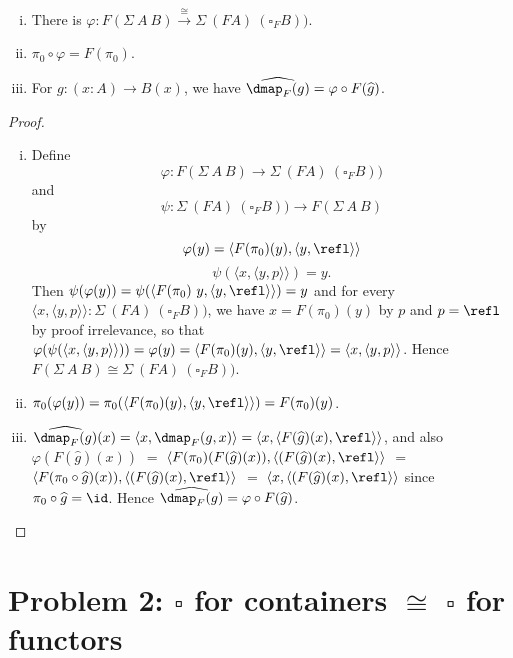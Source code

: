 \documentclass{article}
\begin{document}
\begin{problem}
  \begin{enumerate}[(i)]
  \item There is $\varphi : F (\Sigma\ A\ B) \xrightarrow{\cong} \Sigma\ (F A)\ (\square_F B))$.
  \item $\pi_0 \circ \varphi = F(\pi_0)$.
  \item For $g : (x : A) \to B(x)$, we have $\widehat{\dmap_F(g)} = \varphi \circ F(\widehat{g})$.
  \end{enumerate}
\label{problem1}
\end{problem}
\begin{proof}
  \begin{enumerate}[(i)]
  \item Define
  \[
    \varphi :  F (\Sigma\ A\ B) \to \Sigma\ (F A)\ (\square_F B))
  \]
  and
  \[
    \psi :  \Sigma\ (F A)\ (\square_F B)) \to F (\Sigma\ A\ B)
  \]
  by
  \[
  \varphi(y) = \langle F(\pi_0)(y), \langle y, \refl\rangle\rangle
  \]
  \[
  \psi(\langle x, \langle y, p\rangle\rangle) = y.
  \]
  Then $\psi(\varphi(y)) = \psi(\langle F(\pi_0)\ y, \langle y,
  \refl\rangle\rangle) = y$ and for every $\langle x, \langle y,
  p\rangle\rangle : \Sigma\ (F A)\ (\square_F B))$, we have $x =
  F(\pi_0)(y)$ by $p$ and $p = \refl$ by proof irrelevance, so that
  $\varphi(\psi(\langle x, \langle y, p\rangle\rangle)) = \varphi(y) = \langle
  F(\pi_0)(y), \langle y, \refl\rangle\rangle = \langle x, \langle y,
  p\rangle\rangle $. Hence $F (\Sigma\ A\ B) \cong \Sigma\ (F A)\
  (\square_F B))$.
  \item $\pi_0(\varphi(y)) = \pi_0(\langle F(\pi_0)(y), \langle y, \refl\rangle\rangle) = F(\pi_0)(y)$.
  \item $\widehat{\dmap_F(g)}(x) = \langle x , \dmap_F(g, x)\rangle = \langle x , \langle F(\widehat{g})(x), \refl\rangle\rangle$, and also
 $\varphi(F(\widehat{g})(x))$ $=$ $\langle F(\pi_0)(F(\widehat{g})(x)), \langle (F(\widehat{g})(x), \refl\rangle\rangle$ $=$ $\langle F(\pi_0 \circ \widehat{g})(x)), \langle (F(\widehat{g})(x), \refl\rangle\rangle$ $=$ $\langle x, \langle (F(\widehat{g})(x), \refl\rangle\rangle$ since $\pi_0 \circ \widehat{g} = \id$. Hence $\widehat{\dmap_F(g)} = \varphi \circ F(\widehat{g})$.
  \end{enumerate}
\end{proof}

\section*{Problem 2: $\square$ for containers $\cong$ $\square$ for functors}
\end{document}
